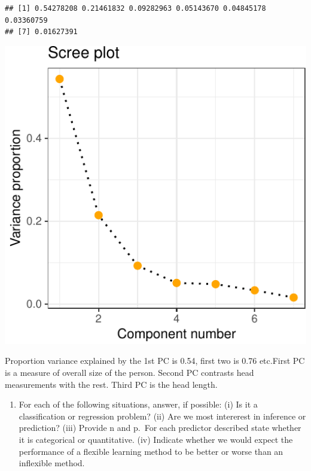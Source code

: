 \documentclass[]{article}
\newenvironment{Shaded}{\begin{snugshade}}{\end{snugshade}}
\newcommand{\KeywordTok}[1]{\textcolor[rgb]{0.13,0.29,0.53}{\textbf{#1}}}
\newcommand{\NormalTok}[1]{#1}
\newcommand{\OperatorTok}[1]{\textcolor[rgb]{0.81,0.36,0.00}{\textbf{#1}}}
\newcommand{\StringTok}[1]{\textcolor[rgb]{0.31,0.60,0.02}{#1}}
\providecommand{\tightlist}{%
  \setlength{\itemsep}{0pt}\setlength{\parskip}{0pt}}
\begin{document}
\begin{verbatim}
## [1] 0.54278208 0.21461832 0.09282963 0.05143670 0.04845178 0.03360759
## [7] 0.01627391
\end{verbatim}

\begin{Shaded}
\end{Shaded}

\begin{center}\includegraphics{sol_A2_files/figure-latex/unnamed-chunk-14-1} \end{center}

Proportion variance explained by the 1st PC is 0.54, first two is 0.76
etc.First PC is a measure of overall size of the person. Second PC
contrasts head measurements with the rest. Third PC is the head length.

\begin{enumerate}
\def\labelenumi{\arabic{enumi}.}
\setcounter{enumi}{3}
\tightlist
\item
  For each of the following situations, answer, if possible: (i) Is it a
  classification or regression problem? (ii) Are we most intererest in
  inference or prediction? (iii) Provide n and p.~For each predictor
  described state whether it is categorical or quantitative. (iv)
  Indicate whether we would expect the performance of a flexible
  learning method to be better or worse than an inflexible method.
\end{enumerate}
\end{document}
